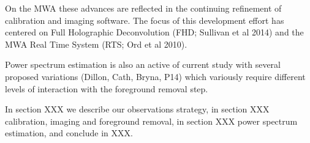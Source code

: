 On the MWA these advances are reflected in the continuing refinement of calibration and imaging software. The focus of this development effort has centered on Full Holographic Deconvolution (FHD; Sullivan et al 2014) and the MWA Real Time System (RTS; Ord et al 2010).  


Power spectrum estimation is also an active of current study with several proposed variations (Dillon, Cath, Bryna, P14) which variously require different levels of interaction with the foreground removal step.





In section XXX we describe our observations strategy, in section XXX calibration, imaging and foreground removal, in section XXX power spectrum estimation, and conclude in XXX.